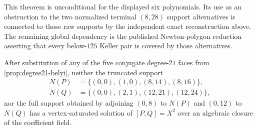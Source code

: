 This theorem is unconditional for the displayed six polynomials.  Its use
as an obstruction to the two normalized terminal \((8,28)\) support
alternatives is connected to those raw supports by the independent exact
reconstruction above.  The remaining global dependency is the published
Newton-polygon reduction asserting that every below-\(125\) Keller pair is
covered by those alternatives.

\begin{theorem}
\label{thm:degree21-two-support-closure}
After substitution of any of the five conjugate degree-\(21\) faces from
\cref{prop:degree21-belyi}, neither the truncated support
\[
\begin{aligned}
N(P)&=\{(0,0),(1,0),(8,14),(8,16)\},\\
N(Q)&=\{(0,0),(2,1),(12,21),(12,24)\},
\end{aligned}
\]
nor the full support obtained by adjoining \((0,8)\) to \(N(P)\) and
\((0,12)\) to \(N(Q)\) has a vertex-saturated solution of
\([P,Q]=X^2\) over an algebraic closure of the coefficient field.
\end{theorem}

